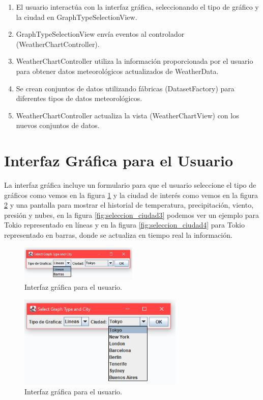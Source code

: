 \documentclass{article}
\begin{document}
\begin{enumerate}
  \item El usuario interactúa con la interfaz gráfica, seleccionando el tipo de gráfico y la ciudad en GraphTypeSelectionView.
  \item GraphTypeSelectionView envía eventos al controlador (WeatherChartController).
  \item WeatherChartController utiliza la información proporcionada por el usuario para obtener datos meteorológicos actualizados de WeatherData.
  \item Se crean conjuntos de datos utilizando fábricas (DatasetFactory) para diferentes tipos de datos meteorológicos.
  \item WeatherChartController actualiza la vista (WeatherChartView) con los nuevos conjuntos de datos.
\end{enumerate}

\section{Interfaz Gráfica para el Usuario}
La interfaz gráfica incluye un formulario para que el usuario seleccione el tipo de gráficos como vemos en la figura \ref{fig:seleccion_ciudad}  y la ciudad de interés como vemos en la figura \ref{fig:seleccion_ciudad2}  y una pantalla para mostrar el historial de temperatura, precipitación, viento, presión y nubes, en la figura \ref{fig:seleccion_ciudad3} podemos ver un ejemplo para Tokio representado en líneas y en la figura \ref{fig:seleccion_ciudad4} para Tokio representado en barras, donde se actualiza en tiempo real la información.

\begin{figure}[H]
    \centering
    \includegraphics[width=0.5\textwidth]{images/image5.png}
    \caption{Interfaz gráfica para el usuario.}
    \label{fig:seleccion_ciudad}
\end{figure}

\begin{figure}[H]
    \centering
    \includegraphics[width=0.7\textwidth]{images/image9.png}
    \caption{ Interfaz gráfica para el usuario.}
    \label{fig:seleccion_ciudad2}
\end{figure}
\end{document}
